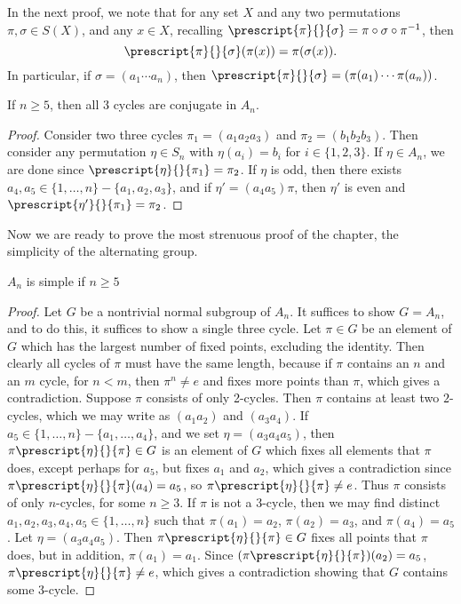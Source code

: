 In the next proof, we note that for any set $X$ and any two permutations $\pi, \sigma \in S(X)$, and any $x \in X$, recalling $\prescript{\pi}{}{\sigma} = \pi \circ \sigma \circ \pi^{-1}$, then
%
\[ \prescript{\pi}{}{\sigma}(\pi(x)) = \pi(\sigma(x)). \]
%
In particular, if $\sigma = (a_1 \cdots a_n)$, then $\prescript{\pi}{}{\sigma} = (\pi(a_1) \cdots \pi(a_n))$.

\begin{corollary}
    If $n \geq 5$, then all $3$ cycles are conjugate in $A_n$.
\end{corollary}
\begin{proof}
    Consider two three cycles $\pi_1 = (a_1 a_2 a_3)$ and $\pi_2 = (b_1 b_2 b_3)$. Then consider any permutation $\eta \in S_n$ with $\eta(a_i) = b_i$ for $i \in \{ 1, 2, 3 \}$. If $\eta \in A_n$, we are done since $\prescript{\eta}{}{\pi_1} = \pi_2$. If $\eta$ is odd, then there exists $a_4, a_5 \in \{ 1, \dots, n \} - \{ a_1, a_2, a_3 \}$, and if $\eta' = (a_4 a_5) \pi$, then $\eta'$ is even and $\prescript{\eta'}{}{\pi_1} = \pi_2$.
\end{proof}

Now we are ready to prove the most strenuous proof of the chapter, the simplicity of the alternating group.

\begin{lemma} $A_n$ is simple if $n \geq 5$ \end{lemma}
\begin{proof}
    Let $G$ be a nontrivial normal subgroup of $A_n$. It suffices to show $G = A_n$, and to do this, it suffices to show a single three cycle. Let $\pi \in G$ be an element of $G$ which has the largest number of fixed points, excluding the identity. Then clearly all cycles of $\pi$ must have the same length, because if $\pi$ contains an $n$ and an $m$ cycle, for $n < m$, then $\pi^n \neq e$ and fixes more points than $\pi$, which gives a contradiction. Suppose $\pi$ consists of only 2-cycles. Then $\pi$ contains at least two $2$-cycles, which we may write as $(a_1 a_2)$ and $(a_3 a_4)$. If $a_5 \in \{ 1, \dots, n \} - \{ a_1, \dots, a_4 \}$, and we set $\eta = (a_3 a_4 a_5)$, then $\pi \prescript{\eta}{}{\pi} \in G$ is an element of $G$ which fixes all elements that $\pi$ does, except perhaps for $a_5$, but fixes $a_1$ and $a_2$, which gives a contradiction since $\pi \prescript{\eta}{}{\pi}(a_4) = a_5$, so $\pi \prescript{\eta}{}{\pi} \neq e$. Thus $\pi$ consists of only $n$-cycles, for some $n \geq 3$. If $\pi$ is not a $3$-cycle, then we may find distinct $a_1, a_2, a_3, a_4, a_5 \in \{ 1, \dots, n \}$ such that $\pi(a_1) = a_2$, $\pi(a_2) = a_3$, and $\pi(a_4) = a_5$. Let $\eta = (a_3 a_4 a_5)$. Then $\pi \prescript{\eta}{}{\pi} \in G$ fixes all points that $\pi$ does, but in addition, $\pi(a_1) = a_1$. Since $(\pi \prescript{\eta}{}{\pi})(a_2) = a_5$, $\pi \prescript{\eta}{}{\pi} \neq e$, which gives a contradiction showing that $G$ contains some 3-cycle.
\end{proof}

